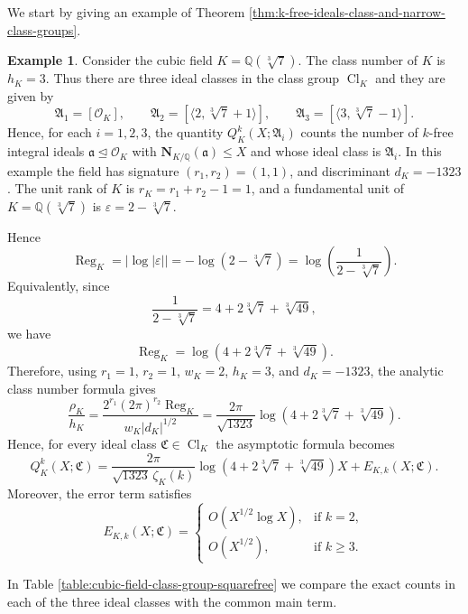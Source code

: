 \documentclass[11pt, reqno]{amsart}
\numberwithin{equation}{section}
\newcommand{\Q}{\mathbb{Q}}
\newcommand{\Cl}{\operatorname{Cl}}
\newcommand{\Nrm}[2]{\mathbf{N}_{#1}(#2)}
\theoremstyle{definition}
\newtheorem{example}[theorem]{Example}
\begin{document}
We start by giving an example of Theorem \ref{thm:k-free-ideals-class-and-narrow-class-groups}.

\begin{example}
Consider the cubic field $K=\Q(\sqrt[3]{7})$. The class number of $K$ is $h_K=3$. Thus there are three ideal classes in the class group  $\Cl_K$ and they are given by
\[
\mathfrak{A}_1=[\mathcal{O}_K],
\qquad
\mathfrak{A}_2=[\langle2,\sqrt[3]{7}+1 \rangle],
\qquad
\mathfrak{A}_3=[\langle 3,\sqrt[3]{7}-1 \rangle].
\]
Hence, for each $i=1,2,3$, the quantity $Q_K^{k}(X;\mathfrak{A}_i)$
counts the number of $k$-free integral ideals $\mathfrak{a}\trianglelefteq \mathcal{O}_K$ with $\Nrm{K/\Q}{\mathfrak{a}}\leq X$ and whose ideal class is $\mathfrak{A}_i$.
In this example the field has signature $(r_1, r_2) = (1, 1)$, and discriminant $d_K=-1323$. The unit rank of $K$ is $r_K = r_1 + r_2 -1 = 1$, and a fundamental unit of $K=\Q(\sqrt[3]{7})$ is $\varepsilon=2-\sqrt[3]{7}$.

Hence
\[
\operatorname{Reg}_K
=
|\log|\varepsilon||
=
-\log(2-\sqrt[3]{7})
=
\log\left(\frac{1}{2-\sqrt[3]{7}}\right).
\]
Equivalently, since
\[
\frac{1}{2-\sqrt[3]{7}}
=
4+2\sqrt[3]{7}+\sqrt[3]{49},
\]
we have
\[
\operatorname{Reg}_K
=
\log\left(4+2\sqrt[3]{7}+\sqrt[3]{49}\right).
\]
Therefore, using $r_1=1$, $r_2=1$, $w_K=2$, $h_K=3$, and $d_K=-1323$, the analytic class number formula gives
\[
\frac{\rho_K}{h_K}
=
\frac{2^{r_1}(2\pi)^{r_2}\operatorname{Reg}_K}
{w_K |d_K|^{1/2}}
=
\frac{2\pi}{\sqrt{1323}}
\log\left(4+2\sqrt[3]{7}+\sqrt[3]{49}\right).
\]
Hence, for every ideal class $\mathfrak{C}\in \Cl_K$ the asymptotic formula becomes
\[
Q_K^k(X;\mathfrak{C})
=
\frac{2\pi}{\sqrt{1323}\,\zeta_K(k)}
\log\left(4+2\sqrt[3]{7}+\sqrt[3]{49}\right)X
+
E_{K,k}(X;\mathfrak{C}).
\]
Moreover, the error term satisfies
\[
E_{K,k}(X;\mathfrak{C}) = 
\begin{cases}
O\left(X^{1/2}\log X\right),
& \text{if } k=2,\\[6pt]
O\left(X^{1/2}\right),
& \text{if } k\geq3.
\end{cases}
\]

In Table \ref{table:cubic-field-class-group-squarefree} we compare the exact counts in each of the three ideal classes with the common main term.


\end{example}
\end{document}
